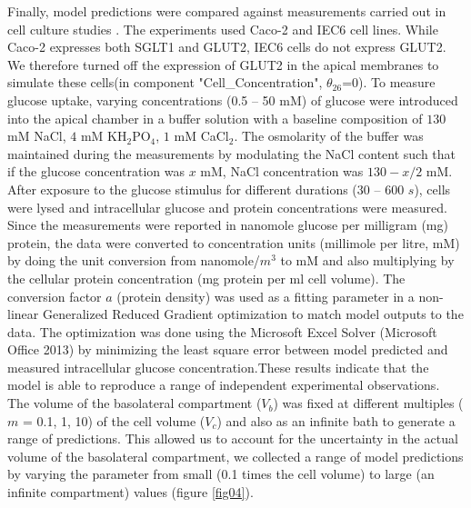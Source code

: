 \documentclass[fleqn,10pt]{physiome}
\begin{document}
Finally, model predictions were compared against measurements carried out in
cell culture studies \citep{zheng2012mechanisms}. The experiments used Caco-2 and
IEC6 cell lines. While Caco-2 expresses both SGLT1 and GLUT2, IEC6 cells
do not express GLUT2. We therefore turned off the expression of GLUT2 in
the apical membranes to simulate these cells(in component "Cell\_Concentration", {$\theta_{26}$}=0). To measure glucose uptake, varying concentrations (0.5 -- 50 mM) of glucose were introduced into the apical chamber in a buffer solution with a baseline composition of $130$ mM NaCl, $4$ mM KH$_2$PO$_4$, $1$ mM CaCl$_2$. The osmolarity of the buffer was maintained during the measurements by modulating the NaCl content such that if the glucose concentration was $x$ mM, NaCl concentration was $130 - x/2$ mM. After exposure to the glucose stimulus for different durations (30 -- 600 $s$), cells were lysed and intracellular glucose and protein concentrations were measured. Since the measurements were reported in nanomole glucose per milligram (mg) protein, the data were converted to concentration units (millimole per litre, mM) by doing the unit conversion from nanomole/$m^{3}$ to mM and also multiplying by the cellular protein concentration (mg protein per ml cell volume). The conversion factor $a$ (protein density) was used as a fitting parameter in a non-linear Generalized Reduced Gradient optimization to match model outputs to the data. The optimization  was done using the Microsoft Excel Solver (Microsoft Office 2013) by minimizing the least square error between model predicted and measured intracellular glucose concentration.These results indicate that the model is able to reproduce a range of independent experimental observations.
The volume of the basolateral compartment ($V_b$) was fixed at different multiples ($m$ = 0.1, 1, 10) of the cell volume ($V_c$) and also as an infinite bath to generate a range of predictions. This allowed us to account for the uncertainty in the actual volume of the basolateral compartment, we collected a range of model predictions by varying the parameter from small (0.1 times the cell volume) to large (an infinite compartment) values (figure \ref{fig04}).\newline
\end{document}
